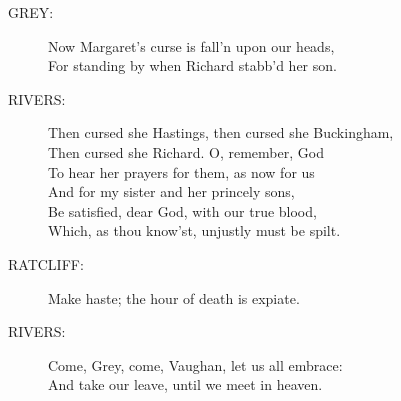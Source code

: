 \documentclass{article}
\begin{document}
\begin{description}
\item[GREY:] 
\hspace{1pt}Now Margaret's curse is fall'n upon our heads,\\
\hspace{1pt}For standing by when Richard stabb'd her son.\\
\end{description}
\begin{description}
\item[RIVERS:] 
\hspace{1pt}Then cursed she Hastings, then cursed she Buckingham,\\
\hspace{1pt}Then cursed she Richard. O, remember, God\\
\hspace{1pt}To hear her prayers for them, as now for us\\
\hspace{1pt}And for my sister and her princely sons,\\
\hspace{1pt}Be satisfied, dear God, with our true blood,\\
\hspace{1pt}Which, as thou know'st, unjustly must be spilt.\\
\end{description}
\begin{description}
\item[RATCLIFF:] 
\hspace{1pt}Make haste; the hour of death is expiate.\\
\end{description}
\begin{description}
\item[RIVERS:] 
\hspace{1pt}Come, Grey, come, Vaughan, let us all embrace:\\
\hspace{1pt}And take our leave, until we meet in heaven.\\
\end{description}
\centering{\it [Exeunt]}\\
\end{document}
